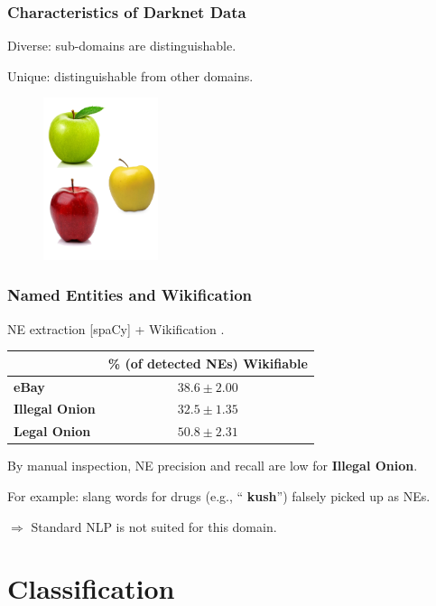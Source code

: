 \documentclass[t,xcolor={svgnames,table}]{beamer}
\begin{document}
\begin{frame}
	\frametitle{Characteristics of Darknet Data}
	
	Diverse: sub-domains are distinguishable.
	\vfill
	
	Unique: distinguishable from other domains.
	
	\begin{figure}
		\centering
		\includegraphics[width=0.3\textwidth]{3different.png}
	\end{figure}
\end{frame}

\begin{frame}
	\frametitle{Named Entities and Wikification}
	
	NE extraction [spaCy] + Wikification \cite{bunescu2006using}.
	\vfill
	
	\begin{center}
	\begin{tabular}{l|c}
	 & \% (of detected NEs) Wikifiable\\
	 \hline
	\textbf{\color{yellow} eBay} & $38.6 \pm2.00$\\
	\textbf{\color{red} Illegal Onion} & $32.5 \pm1.35$\\
	\textbf{\color{green} Legal Onion} & $50.8 \pm2.31$
	\end{tabular}
	\end{center}
	\vfill

	By manual inspection, NE precision and recall are low for \textbf{\color{red} Illegal Onion}.
	
	For example: slang words for drugs (e.g., ``\textbf{\color{red} kush}'') falsely picked up as NEs.	
	\vfill
	
	$\Rightarrow$ Standard NLP is not suited for this domain.
\end{frame}

\section{Classification}
\end{document}
